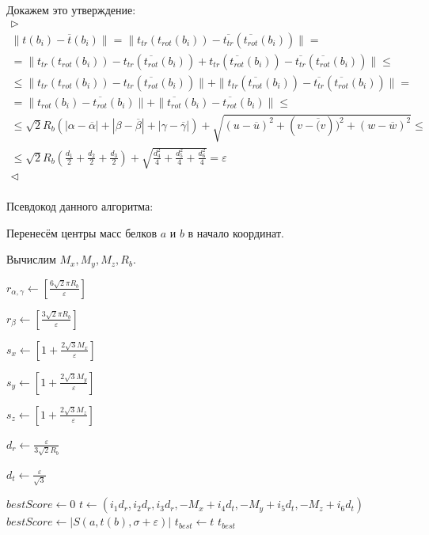 \documentclass[a4paper]{extreport}
\newcommand{\ls}{\left[}
\newcommand{\rs}{\right]}
\newcommand{\lp}{\left(}
\newcommand{\rp}{\right)}
\newcommand{\la}{\leftarrow}
\newcommand{\eps}{\varepsilon}
\begin{document}
Докажем это утверждение:
\begin{gather*}
\triangleright\\
\| t(b_i) - \overline{t}(b_i)\| = \| t_{tr}(t_{rot}(b_i)) - \overline{t_{tr}}(\overline{t_{rot}}(b_i)) \| = \\ =
\| t_{tr}(t_{rot}(b_i)) - t_{tr}(\overline{t_{rot}}(b_i)) + t_{tr}(\overline{t_{rot}}(b_i)) - \overline{t_{tr}}(\overline{t_{rot}}(b_i)) \| \leq \\ 
\leq
\| t_{tr}(t_{rot}(b_i)) - t_{tr}(\overline{t_{rot}}(b_i))\| + \| t_{tr}(\overline{t_{rot}}(b_i)) - \overline{t_{tr}}(\overline{t_{rot}}(b_i)) \| = \\ =
\| t_{rot}(b_i) - \overline{t_{rot}}(b_i)\| + \| \overline{t_{rot}}(b_i) -\overline{t_{rot}}(b_i) \| \leq \\ \leq
\sqrt{2}R_b(|\alpha - \overline{\alpha}| + |\beta - \overline{\beta}| + |\gamma - \overline{\gamma}|) + \sqrt{(u - \overline{u})^2 + (v - \overline(v))^2 + (w - \overline{w})^2} \leq \\ \leq
\sqrt{2}R_b \lp \frac{d_1}{2} + \frac{d_2}{2} + \frac{d_3}{2} \rp + \sqrt{\frac{d_4^2}{4} + \frac{d_5^2}{4} + \frac{d_6^2}{4}} = \eps\\
\triangleleft\\
\end{gather*}

Псевдокод данного алгоритма:
\begin{algorithmic}[1]
\item Перенесём центры масс белков $a$ и $b$ в начало координат.
\item Вычислим $M_x, M_y, M_z, R_b$.
\item $r_{\alpha, \gamma} \la \ls \frac{6\sqrt{2}\pi R_b}{\eps}\rs$
\item $r_{\beta} \la \ls \frac{3\sqrt{2}\pi R_b}{\eps}\rs$
\item $s_x \la \ls 1 + \frac{2\sqrt{3}M_x}{\eps} \rs$
\item $s_y \la \ls 1 + \frac{2\sqrt{3}M_y}{\eps} \rs$
\item $s_z \la \ls 1 + \frac{2\sqrt{3}M_z}{\eps} \rs$
\item $d_r \la \frac{\eps}{3\sqrt{2}R_b}$
\item $d_t \la \frac{\eps}{\sqrt{3}}$
\item $bestScore \la 0$
\State $t \la (i_1d_r, i_2d_r, i_3d_r, -M_x + i_4d_t, -M_y + i_5d_t, -M_z + i_6d_t)$
\If {$|S(a, t(b), \sigma + \eps)| > bestScore$}
    \State $bestScore \la |S(a, t(b), \sigma + \eps)|$
    \State $t_{best} \la t$
\EndIf
\EndFor
\EndFor
\State \Return $t_{best}$
\end{algorithmic}
\end{document}
